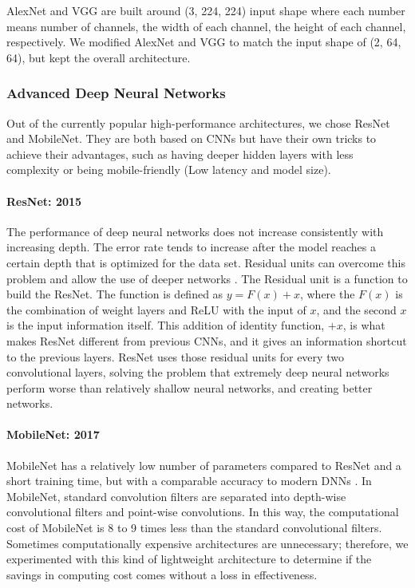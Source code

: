 AlexNet and VGG are built around (3, 224, 224) input shape where each number means number of channels, the width of each channel, the height of each channel, respectively.
We modified AlexNet and VGG to match the input shape of (2, 64, 64), but kept the overall architecture.

\subsubsection{Advanced Deep Neural Networks}
\label{subsubsect:DNN}
Out of the currently popular high-performance architectures, we chose ResNet and MobileNet. They are both based on CNNs but have their own tricks to achieve their advantages, such as having deeper hidden layers with less complexity or being mobile-friendly (Low latency and model size).

\paragraph{ResNet: 2015}
\label{paragraph:ResNet}
The performance of deep neural networks does not increase consistently with increasing depth. 
The error rate tends to increase after the model reaches a certain depth that is optimized for the data set. 
Residual units can overcome this problem and allow the use of deeper networks \citep{he2015deep}. 
The Residual unit is a function to build the ResNet.
The function is defined as $y=F(x)+x$, where the $F(x)$ is the combination of weight layers and ReLU with the input of $x$, and the second $x$ is the input information itself.
This addition of identity function, $+x$, is what makes ResNet different from previous CNNs, and it gives an information shortcut to the previous layers.
ResNet uses those residual units for every two convolutional layers, solving the problem that extremely deep neural networks perform worse than relatively shallow neural networks, and creating better networks.

\paragraph{MobileNet: 2017}
\label{paragraph:MobileNet}
MobileNet has a relatively low number of parameters compared to ResNet and a short training time, but with a comparable accuracy to modern DNNs \citep{howard2017mobilenets}.
In MobileNet, standard convolution filters are separated into depth-wise convolutional filters and point-wise convolutions. 
In this way, the computational cost of MobileNet is 8 to 9 times less than the standard convolutional filters. 
Sometimes computationally expensive architectures are unnecessary; therefore, we experimented with this kind of lightweight architecture to determine if the savings in computing cost comes without a loss in effectiveness.

